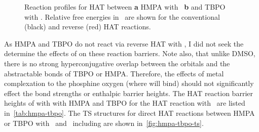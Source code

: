 \begin{figure}[!htbp]
  \centering

  \caption[Reaction profiles for HAT between HMPA with \bno\, and TBPO with
  \bno.]{Reaction profiles for HAT between \textbf{a} HMPA with \bno\,
  \textbf{b} and TBPO with \bno. Relative free energies in \kcalmol\ are shown
  for the conventional (black) and reverse (red) HAT reactions.}
  \label{fig:hmpa-tbpo-bno}
\end{figure}


As HMPA and TBPO do not react via reverse HAT with \bno, I did not seek the
determine the effects of  on these reaction barriers. Note also, that
unlike DMSO, there is no strong hyperconjugative overlap between the 
orbitals and the abstractable  bonds of TBPO or HMPA. Therefore, the
effects of metal complexation to the phosphine oxygen (where  will
bind) should not significantly effect the  bond strengths or enthalpic
barrier heights. The HAT reaction barrier heights of  with with HMPA
and TBPO for the HAT reaction with \cumo\ are listed in~\ref{tab:hmpa-tbpo}.
The TS structures for direct HAT reactions between HMPA or TBPO with \cumo\ and
\bno\ including  are shown in~\ref{fig:hmpa-tbpo-ts}.


